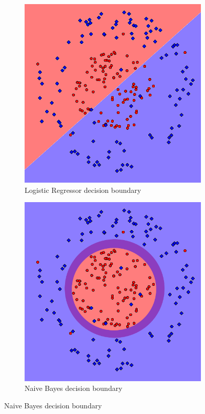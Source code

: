 \documentclass[letterpaper,10pt]{article} %
\begin{document}
\begin{figure}[h]
\centering
\begin{subfigure}[b]{\textwidth}
\includegraphics[width=\textwidth]{handout/q3-2-logistic}
\caption{Logistic Regressor decision boundary}
\label{fig:log2}
\end{subfigure}%

\begin{subfigure}[b]{\textwidth}
\includegraphics[width=\textwidth]{handout/q3-2-bayes}
\caption{Naive Bayes decision boundary}
\label{fig:bayes2}
\end{subfigure}


\end{figure}
\end{document}
